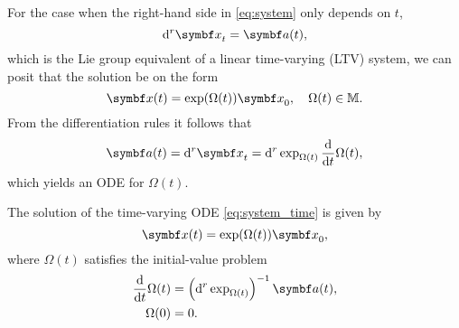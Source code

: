 For the case when the right-hand side in \eqref{eq:system} only depends on $t$,
\begin{equation}
  \label{eq:system_time}
  \mathrm{d}^r \x_t = \a(t),
\end{equation}
which is the Lie group equivalent of a linear time-varying (LTV) system, we can posit that the solution be on the form
\begin{equation}
  \x(t) = \exp (\Omega(t)) \x_0, \quad \Omega(t) \in \M.
\end{equation}
From the differentiation rules it follows that
\begin{equation}
  \a(t) = \mathrm{d}^r \x_t = \mathrm{d}^r \exp_{\Omega(t)} \frac{\mathrm{d}}{\mathrm{d}t}\Omega(t),
\end{equation}
which yields an ODE for $\Omega(t)$.
\begin{important}
  \begin{theorem}
    \label{thm:magnus_solution}
    The solution of the time-varying ODE \eqref{eq:system_time} is given by
    \begin{equation}
      \x(t) = \exp(\Omega(t)) \x_0,
    \end{equation}
    where $\Omega(t)$ satisfies the initial-value problem
    \begin{equation}
      \label{eq:magnus_omega_ode}
      \begin{aligned}
        \frac{\mathrm{d}}{\mathrm{d}t} \Omega(t) & = \left(\mathrm{d}^r \exp_{\Omega(t)}\right)^{-1} \a(t), \\
        \Omega(0)                                & = 0.
      \end{aligned}
    \end{equation}
  \end{theorem}
\end{important}


